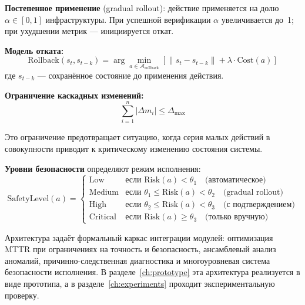 \textbf{Постепенное применение} (gradual rollout): действие применяется на долю $\alpha \in [0,1]$ инфраструктуры. При успешной верификации $\alpha$ увеличивается до~1; при ухудшении метрик --- инициируется откат.

\textbf{Модель отката:}
\begin{equation}
\text{Rollback}(s_t, s_{t-k}) = \arg\min_{a \in \mathcal{A}_{\text{rollback}}} \left[ \|s_t - s_{t-k}\| + \lambda \cdot \text{Cost}(a) \right]
\label{eq:rollback_model}
\end{equation}
где $s_{t-k}$ --- сохранённое состояние до применения действия.

\textbf{Ограничение каскадных изменений:}
\begin{equation}
\sum_{i=1}^{n} |\Delta m_i| \leq \Delta_{\max}
\label{eq:change_limit}
\end{equation}

Это ограничение предотвращает ситуацию, когда серия малых действий в совокупности приводит к критическому изменению состояния системы.

\textbf{Уровни безопасности} определяют режим исполнения:
\begin{equation}
\text{SafetyLevel}(a) = \begin{cases}
\text{Low} & \text{если } \text{Risk}(a) < \theta_1 \quad \text{(автоматическое)} \\
\text{Medium} & \text{если } \theta_1 \leq \text{Risk}(a) < \theta_2 \quad \text{(gradual rollout)} \\
\text{High} & \text{если } \theta_2 \leq \text{Risk}(a) < \theta_3 \quad \text{(с подтверждением)} \\
\text{Critical} & \text{если } \text{Risk}(a) \geq \theta_3 \quad \text{(только вручную)}
\end{cases}
\label{eq:safety_levels}
\end{equation}

\medskip

Архитектура задаёт формальный каркас интеграции модулей: оптимизация MTTR при ограничениях на точность и безопасность, ансамблевый анализ аномалий, причинно-следственная диагностика и многоуровневая система безопасности исполнения. В разделе~\ref{ch:prototype} эта архитектура реализуется в виде прототипа, а в разделе~\ref{ch:experiments} проходит экспериментальную проверку.

